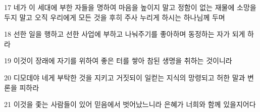 \par 17 네가 이 세대에 부한 자들을 명하여 마음을 높이지 말고 정함이 없는 재물에 소망을 두지 말고 오직 우리에게 모든 것을 후히 주사 누리게 하시는 하나님께 두며
\par 18 선한 일을 행하고 선한 사업에 부하고 나눠주기를 좋아하며 동정하는 자가 되게 하라
\par 19 이것이 장래에 자기를 위하여 좋은 터를 쌓아 참된 생명을 취하는 것이니라
\par 20 디모데야 네게 부탁한 것을 지키고 거짓되이 일컫는 지식의 망령되고 허한 말과 변론을 피하라
\par 21 이것을 좇는 사람들이 있어 믿음에서 벗어났느니라 은혜가 너희와 함께 있을지어다


